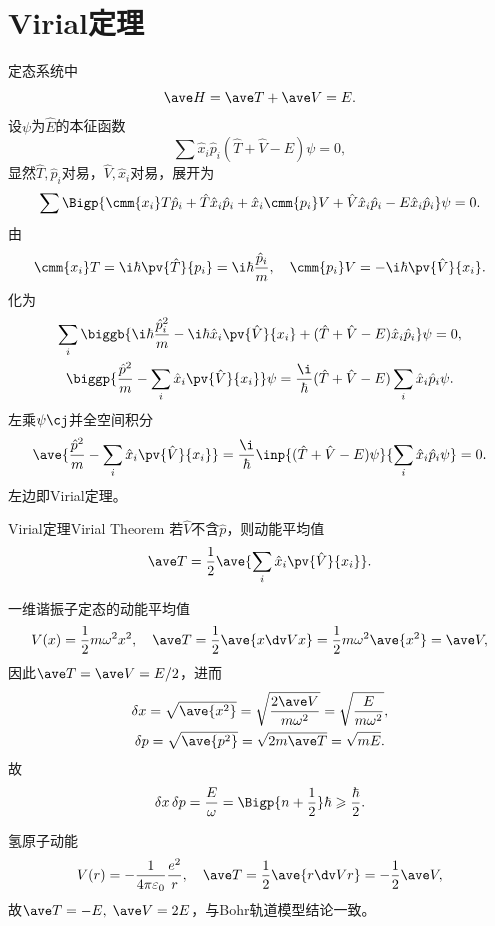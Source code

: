 \section{Virial定理}
定态系统中
\[
	\ave H=\ave T+\ave V=E.
\]
设$\psi$为$\hat E$的本征函数
\[
	\sum\hat x_i\hat p_i(\hat T+\hat V-E)\psi=0,
\]
显然$\hat T,\hat p_i$对易，$\hat V,\hat x_i$对易，展开为
\[
	\sum\Bigp{\cmm{x_i}T\hat p_i+\hat T\hat x_i\hat p_i+\hat x_i\cmm{p_i}V+\hat V\hat x_i\hat p_i-E\hat x_i\hat p_i}\psi=0.
\]
由
\[
	\cmm{x_i}T=\i\hbar\pv{\hat T}{p_i}=\i\hbar\frac{\hat p_i}m,\quad \cmm{p_i}V=-\i\hbar\pv{\hat V}{x_i}.
\]
化为
\begin{gather*}
	\sum_i\biggb{\i\hbar\frac{\hat p_i^2}m-\i\hbar\hat x_i\pv{\hat V}{x_i}+(\hat T+\hat V-E)\hat x_i\hat p_i}\psi=0,\\
	\biggp{\frac{\hat p^2}m-\sum_i\hat x_i\pv{\hat V}{x_i}}\psi=\frac\i\hbar(\hat T+\hat V-E)\sum_i\hat x_i\hat p_i\psi.
\end{gather*}
左乘$\psi\cj$并全空间积分
\[
	\ave{\frac{\hat p^2}m-\sum_i\hat x_i\pv{\hat V}{x_i}}=\frac\i\hbar\inp{(\hat T+\hat V-E)\psi}{\sum_i\hat x_i\hat p_i\psi}=0.
\]
左边即Virial定理。
\begin{theorem}{Virial定理}{Virial Theorem}
	若$\hat V$不含$\hat p$，则动能平均值
	\begin{align}
		\ave T=\frac12\ave{\sum_i\hat x_i\pv{\hat V}{x_i}}.
	\end{align}
\end{theorem}
\begin{example}{一维谐振子定态的动能平均值}{}
	\[
		V(x)=\frac12m\omega^2x^2,\quad\ave T=\frac12\ave{x\dv Vx}=\frac12m\omega^2\ave{x^2}=\ave V,
	\]
	因此$\ave T=\ave V=E/2$，进而
	\begin{gather*}
		\delta x=\sqrt{\ave{x^2}}=\sqrt{\frac{2\ave V}{m\omega^2}}=\sqrt{\frac E{m\omega^2}},\\
		\delta p=\sqrt{\ave{p^2}}=\sqrt{2m\ave T}=\sqrt{mE}.
	\end{gather*}
	故
	\[
		\delta x\,\delta p=\frac E\omega=\Bigp{n+\frac12}\hbar\geqslant\frac\hbar{2}.
	\]
\end{example}
\begin{example}{氢原子动能}{}
	\[
		V(r)=-\frac1{4\pi\varepsilon_0}\frac{e^2}r,\quad\ave T=\frac12\ave{r\dv Vr}=-\frac12\ave V,
	\]
	故$\ave T=-E,\;\ave V=2E$，与Bohr轨道模型结论一致。
\end{example}
